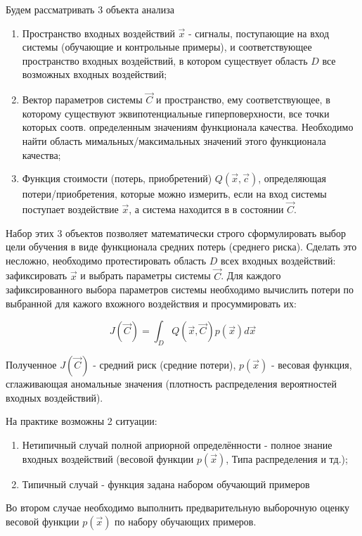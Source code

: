 \documentclass{article}
\begin{document}
Будем рассматривать 3 объекта анализа
\begin{enumerate}
    \item Пространство входных воздействий $\vec{x}$ - сигналы, поступающие на вход системы (обучающие и контрольные примеры), и соответствующее пространство входных воздействий, в котором существует область $D$ все возможных входных воздействий;
    \item Вектор параметров системы $\vec{C}$ и пространство, ему соответствующее, в которому существуют эквипотенциальные гиперповерхности, все точки которых соотв. определенным значениям функционала качества. Необходимо найти область мимальных/максимальных значений этого функционала качества;
    \item Функция стоимости (потерь, приобретений) $Q(\vec{x}, \vec{c})$, определяющая потери/приобретения, которые можно измерить, если на вход системы поступает воздействие $\vec{x}$, а система находится в в состоянии $\vec{C}$.
\end{enumerate}

Набор этих 3 объектов позволяет математически строго сформулировать выбор цели обучения в виде функционала средних потерь (среднего риска).
Сделать это несложно, необходимо протестировать область $D$ всех входных воздействий: зафиксировать $\vec{x}$ и выбрать параметры системы $\vec{C}$. 
Для каждого зафиксированного выбора параметров системы необходимо вычислить потери по выбранной для кажого вхожного воздействия и просуммировать их:

\begin{equation}
    J(\vec{C}) = \int_{D} Q(\vec{x}, \vec{C}) p(\vec{x}) d\vec{x}
\end{equation}

Полученное $J(\vec{C})$ - средний риск (средние потери), $p(\vec{x})$ - весовая функция, сглаживающая аномальные значения (плотность распределения вероятностей входных воздействий).

На практике возможны 2 ситуации:
\begin{enumerate}
    \item Нетипичный случай полной априорной определённости - полное знание входных воздействий (весовой функции $p(\vec{x})$, Типа распределения и тд.);
    \item Типичный случай - функция задана набором обучающий примеров
\end{enumerate}

Во втором случае необходимо выполнить предварительную выборочную оценку весовой функции $p(\vec{x})$ по набору обучающих примеров.
\end{document}
